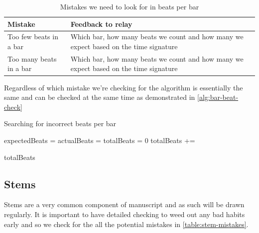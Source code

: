\begin{table}[H]
    \renewcommand{\arraystretch}{1.6}
    \begin{tabularx}{\textwidth}{ lX }
        \toprule
        Mistake & Feedback to relay \\
        \midrule
        Too few beats in a bar & Which bar, how many beats we count and how many we expect based on the time signature \\
        Too many beats in a bar & Which bar, how many beats we count and how many we expect based on the time signature \\
        \bottomrule
    \end{tabularx}

    \caption{Mistakes we need to look for in beats per bar}
    \label{table:bar-beat-errors}
\end{table}

Regardless of which mistake we're checking for the algorithm is essentially the same and can be checked at the same time as demonstrated in \cref{alg:bar-beat-check}

\begin{algorithm}[H]
  \caption{Searching for incorrect beats per bar}
  \label{alg:bar-beat-check}

  \begin{algorithmic}
          \State expectedBeats = 
          \State actualBeats = 
          \EndIf
        \EndFor
    \EndProcedure
    \Statex
        \State totalBeats = 0
          \State totalBeats += 
        \EndFor

        \Return totalBeats
    \EndProcedure
  \end{algorithmic}
\end{algorithm}

\subsection{Stems}

Stems are a very common component of manuscript and as such will be drawn regularly. It is important to have detailed checking to weed out any bad habits early and so we check for the all the potential mistakes in \cref{table:stem-mistakes}.

